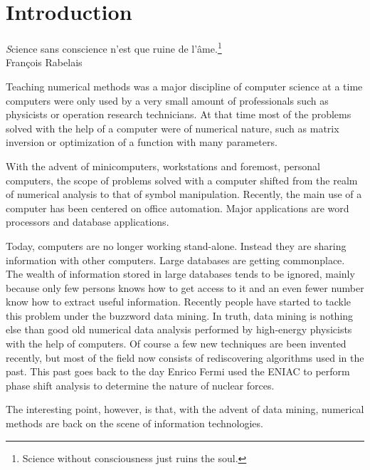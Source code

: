 %
%

\chapter{Introduction} \vspace{1 ex}
\label{ch:introduction}
\begin{flushright}
{\textsl Science sans conscience n'est que ruine de
l'\^ame.}\footnote{Science without consciousness just ruins the
soul.}\\ Fran\c{c}ois Rabelais
\end{flushright}
\vspace{1 ex} Teaching numerical methods was a major discipline of
computer science at a time computers were only used by a very
small amount of professionals such as physicists or operation
research technicians. At that time most of the problems solved
with the help of a computer were of numerical nature, such as
matrix inversion or optimization of a function with many
parameters.
\par
With the advent of minicomputers, workstations and foremost,
personal computers, the scope of problems solved with a computer
shifted from the realm of numerical analysis to that of symbol
manipulation. Recently, the main use of a computer has been
centered on office automation. Major applications are word
processors and database applications.
\par
Today, computers are no longer working stand-alone. Instead they
are sharing information with other computers. Large databases are
getting commonplace. The wealth of information stored in large
databases tends to be ignored, mainly because only few persons
knows how to get access to it and an even fewer number know how to
extract useful information. Recently people have started to tackle
this problem under the buzzword data mining. In truth, data mining
is nothing else than good old numerical data analysis performed by
high-energy physicists with the help of computers. Of course a few
new techniques are been invented recently, but most of the field
now consists of rediscovering algorithms used in the past. This
past goes back to the day Enrico Fermi used the ENIAC to perform
phase shift analysis to determine the nature of nuclear forces.
\par
The interesting point, however, is that, with the advent of data
mining, numerical methods are back on the scene of information
technologies.

